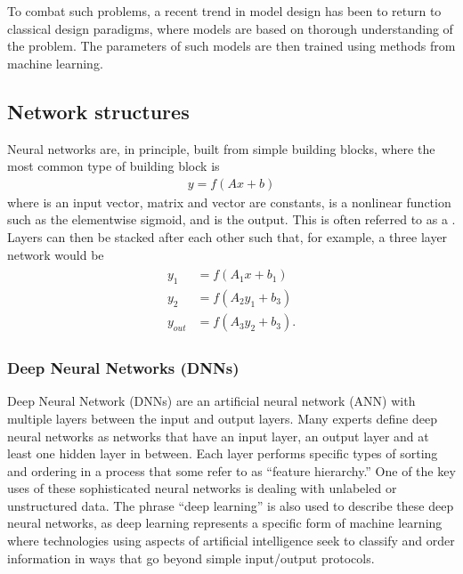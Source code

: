 \documentclass[letterpaper,10pt,english]{jupyterBook}
\begin{document}
\sphinxAtStartPar
To combat such problems, a recent trend in model design has been to
return to classical design paradigms, where models are based on thorough
understanding of the problem. The parameters of such models are then
trained using methods from machine learning.


\subsection{Network structures}
\label{\detokenize{Modelling/Neural_networks:network-structures}}
\sphinxAtStartPar
Neural networks are, in principle, built from simple building blocks,
where the most common type of building block is
\begin{equation*}
\begin{split} y = f(A x + b) \end{split}
\end{equation*}
\sphinxAtStartPar
where  is an input vector, matrix  and vector  are constants,
 is a non\sphinxhyphen{}linear function such as the element\sphinxhyphen{}wise sigmoid, and 
is the output. This is often referred to as a . Layers can then
be stacked after each other such that, for example, a three layer
network would be
\begin{equation*}
\begin{split} \begin{matrix} y_1 &= f(A_1 x + b_1)\\ y_2 &= f(A_2 y_1 +
b_3)\\ y_{out} &= f(A_3 y_2 + b_3). \end{matrix} \end{split}
\end{equation*}

\subsubsection{Deep Neural Networks (DNNs)}
\label{\detokenize{Modelling/Neural_networks:deep-neural-networks-dnns}}
\sphinxAtStartPar
Deep Neural Network (DNNs) are an artificial neural network (ANN) with
multiple layers between the input and output layers. Many experts define
deep neural networks as networks that have an input layer, an output
layer and at least one hidden layer in between. Each layer performs
specific types of sorting and ordering in a process that some refer to
as “feature hierarchy.” One of the key uses of these sophisticated
neural networks is dealing with unlabeled or unstructured data. The
phrase “deep learning” is also used to describe these deep neural
networks, as deep learning represents a specific form of machine
learning where technologies using aspects of artificial intelligence
seek to classify and order information in ways that go beyond simple
input/output protocols.
\end{document}
